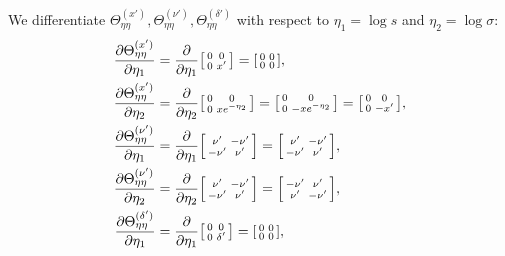 \documentclass{article}
\begin{document}
We differentiate $\Theta_{\eta\eta}^{(x')}, \Theta_{\eta\eta}^{(\nu')}, \Theta_{\eta\eta}^{(\delta')}$ with respect to $\eta_1 = \log s$ and $\eta_2 = \log \sigma$:
%
\begin{align}
  \frac{\partial \Theta_{\eta\eta}^{(x')}}{\partial \eta_1}      & = \frac{\partial}{\partial \eta_1} \begin{bsmallmatrix} 0 & 0 \\ 0 & x' \end{bsmallmatrix} = \begin{bsmallmatrix} 0 & 0 \\ 0 & 0 \end{bsmallmatrix},                                   \\
  \frac{\partial \Theta_{\eta\eta}^{(x')}}{\partial \eta_2}      & = \frac{\partial}{\partial \eta_2} \begin{bsmallmatrix} 0 & 0 \\ 0 & x e^{-\eta_2} \end{bsmallmatrix} = \begin{bsmallmatrix} 0 & 0 \\ 0 & -x e^{-\eta_2} \end{bsmallmatrix} = \begin{bsmallmatrix} 0 & 0 \\ 0 & -x' \end{bsmallmatrix}, \\
  \frac{\partial \Theta_{\eta\eta}^{(\nu')}}{\partial \eta_1}    & = \frac{\partial}{\partial \eta_1} \begin{bsmallmatrix} \nu' & -\nu' \\ -\nu' & \nu' \end{bsmallmatrix} = \begin{bsmallmatrix} \nu' & -\nu' \\ -\nu' & \nu' \end{bsmallmatrix},                                   \\
  \frac{\partial \Theta_{\eta\eta}^{(\nu')}}{\partial \eta_2}    & = \frac{\partial}{\partial \eta_2} \begin{bsmallmatrix} \nu' & -\nu' \\ -\nu' & \nu' \end{bsmallmatrix} = \begin{bsmallmatrix} -\nu' & \nu' \\ \nu' & -\nu' \end{bsmallmatrix},                                   \\
  \frac{\partial \Theta_{\eta\eta}^{(\delta')}}{\partial \eta_1} & = \frac{\partial}{\partial \eta_1} \begin{bsmallmatrix} 0 & 0 \\ 0 & \delta' \end{bsmallmatrix} = \begin{bsmallmatrix} 0 & 0 \\ 0 & 0 \end{bsmallmatrix},                                   \\

\end{align}
\end{document}
